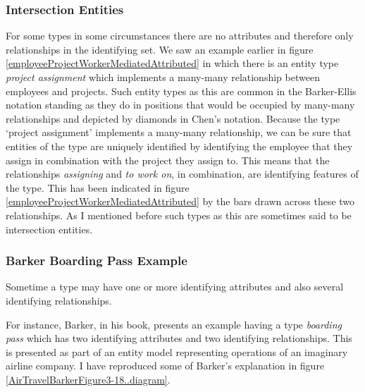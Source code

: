 \subsubsection{Intersection Entities}
\mynote 
{}
For some types in some circumstances there are no attributes and therefore only relationships in the identifying set. 
We saw an example earlier
in figure \ref{employeeProjectWorkerMediatedAttributed} in  which there is an entity type
\textit{project assignment} which implements a many-many relationship between employees and projects. 
Such entity types as this are common in the Barker-Ellis notation 
standing as they do in positions that would be occupied by many-many relationships
 and depicted by  diamonds in Chen's notation. 
 Because the type `project assignment' implements a many-many relationship, we can be sure that entities of the type  are uniquely identified by 
 identifying the employee that they assign in combination with the project they assign to. This means that the relationships \textit{assigning} and \textit{to work on}, in combination, are identifying features of the type. This has been indicated in 
figure  \ref{employeeProjectWorkerMediatedAttributed} by the bars drawn across these two relationships. As I mentioned before such types as this are sometimes said to be intersection entities.
\subsubsection{Barker Boarding Pass Example}
Sometime a type may have one or more identifying attributes and also several identifying relationships.

For instance, Barker, in his book, presents an example having a type \textit{boarding pass} which has two identifying attributes and two identifying relationships. This is presented as
part of  an entity model representing operations of an imaginary airline company.
I have reproduced some of Barker's explanation in figure \ref{AirTravelBarkerFigure3-18..diagram}. 


